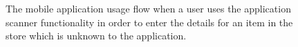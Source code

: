 \documentclass[a4paper,11pt]{report}
\begin{document}
\begin{appendix}
    \begin{figure}
        \caption{The mobile application usage flow when a user uses the application scanner functionality in order to enter the details for an item in the store which is unknown to the application.}
        \label{fig:mobileUIpt2}
    \end{figure}



\end{appendix}
\end{document}
